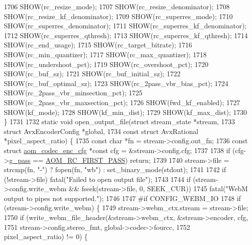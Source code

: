 \begin{DoxyCodeInclude}
{{{{{{{{{{{{{{{{{{{{{{{{{{{{{{{1706   SHOW(rc\_resize\_mode);
1707   SHOW(rc\_resize\_denominator);
1708   SHOW(rc\_resize\_kf\_denominator);
1709   SHOW(rc\_superres\_mode);
1710   SHOW(rc\_superres\_denominator);
1711   SHOW(rc\_superres\_kf\_denominator);
1712   SHOW(rc\_superres\_qthresh);
1713   SHOW(rc\_superres\_kf\_qthresh);
1714   SHOW(rc\_end\_usage);
1715   SHOW(rc\_target\_bitrate);
1716   SHOW(rc\_min\_quantizer);
1717   SHOW(rc\_max\_quantizer);
1718   SHOW(rc\_undershoot\_pct);
1719   SHOW(rc\_overshoot\_pct);
1720   SHOW(rc\_buf\_sz);
1721   SHOW(rc\_buf\_initial\_sz);
1722   SHOW(rc\_buf\_optimal\_sz);
1723   SHOW(rc\_2pass\_vbr\_bias\_pct);
1724   SHOW(rc\_2pass\_vbr\_minsection\_pct);
1725   SHOW(rc\_2pass\_vbr\_maxsection\_pct);
1726   SHOW(fwd\_kf\_enabled);
1727   SHOW(kf\_mode);
1728   SHOW(kf\_min\_dist);
1729   SHOW(kf\_max\_dist);
1730 \}
1731 
1732 \textcolor{keyword}{static} \textcolor{keywordtype}{void} open\_output\_file(\textcolor{keyword}{struct} stream\_state *stream,
1733                              \textcolor{keyword}{struct} AvxEncoderConfig *global,
1734                              \textcolor{keyword}{const} \textcolor{keyword}{struct} AvxRational *pixel\_aspect\_ratio) \{
1735   \textcolor{keyword}{const} \textcolor{keywordtype}{char} *fn = stream->config.out\_fn;
1736   \textcolor{keyword}{const} \textcolor{keyword}{struct }\hyperlink{structaom__codec__enc__cfg}{aom\_codec\_enc\_cfg} *\textcolor{keyword}{const} cfg = &stream->config.cfg;
1737 
1738   \textcolor{keywordflow}{if} (cfg->\hyperlink{structaom__codec__enc__cfg_aad58e4d10c7904d50ce959aef202dc64}{g\_pass} == \hyperlink{group__encoder_gga92b6709b58dc3435e3ba652da562eda1ad342b33a290482c20238bfde5d9bea1e}{AOM\_RC\_FIRST\_PASS}) \textcolor{keywordflow}{return};
1739 
1740   stream->file = strcmp(fn, \textcolor{stringliteral}{"-"}) ? fopen(fn, \textcolor{stringliteral}{"wb"}) : set\_binary\_mode(stdout);
1741 
1742   \textcolor{keywordflow}{if} (!stream->file) fatal(\textcolor{stringliteral}{"Failed to open output file"});
1743 
1744   \textcolor{keywordflow}{if} (stream->config.write\_webm && fseek(stream->file, 0, SEEK\_CUR))
1745     fatal(\textcolor{stringliteral}{"WebM output to pipes not supported."});
1746 
1747 \textcolor{preprocessor}{#if CONFIG\_WEBM\_IO}
1748   \textcolor{keywordflow}{if} (stream->config.write\_webm) \{
1749     stream->webm\_ctx.stream = stream->file;
1750     \textcolor{keywordflow}{if} (write\_webm\_file\_header(&stream->webm\_ctx, &stream->encoder, cfg,
1751                                stream->config.stereo\_fmt, global->codec->fourcc,
1752                                pixel\_aspect\_ratio) != 0) \{
}}}}}}}}}}}}}}}}}}}}}}}}}}}}}}}
\end{DoxyCodeInclude}
